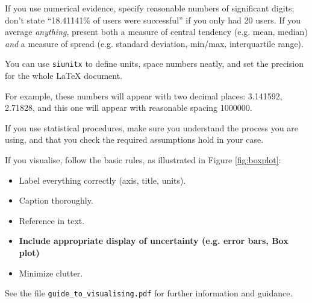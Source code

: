 \documentclass{l4proj}
\begin{document}
If you use numerical evidence, specify reasonable numbers of significant digits; don't state ``18.41141\% of users were successful'' if you only had 20 users. If you average \textit{anything}, present both a measure of central tendency (e.g. mean, median) \textit{and} a measure of spread (e.g. standard deviation, min/max, interquartile range).

You can use \texttt{siunitx} to define units, space numbers neatly, and set the precision for the whole LaTeX document. 


For example, these numbers will appear with two decimal places: \num{3.141592}, \num{2.71828}, and this one will appear with reasonable spacing \num{1000000}.



If you use statistical procedures, make sure you understand the process you are using,
and that you check the required assumptions hold in your case. 

If you visualise, follow the basic rules, as illustrated in Figure \ref{fig:boxplot}:
\begin{itemize}
\item Label everything correctly (axis, title, units).
\item Caption thoroughly.
\item Reference in text.
\item \textbf{Include appropriate display of uncertainty (e.g. error bars, Box plot)}
\item Minimize clutter.
\end{itemize}

See the file \texttt{guide\_to\_visualising.pdf} for further information and guidance.
\end{document}
